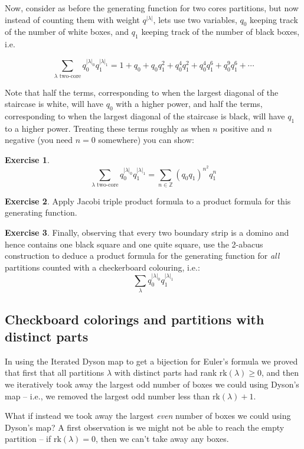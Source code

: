 \documentclass{article}
\theoremstyle{definition}
\newtheorem{exercise}{Exercise}
\begin{document}
Now, consider as before the generating function for two cores partitions, but now instead of counting them with weight $q^{|\lambda|}$, lets use two variables, $q_0$ keeping track of the number of white boxes, and $q_1$ keeping track of the number of black boxes, i.e.

$$\sum_{\lambda \textrm{ two-core}}q_0^{|\lambda|_0}q_1^{|\lambda|_1}=1+q_0+q_0q_1^2+q_0^4q_1^2+q_0^4q_1^6+q_0^9q_1^6+\cdots$$

Note that half the terms, corresponding to when the largest diagonal of the staircase is white, will have $q_0$ with a higher power, and half the terms, corresponding to when the largest diagonal of the staircase is black, will have $q_1$ to a higher power. Treating these terms roughly as when $n$ positive and $n$ negative (you need $n=0$ somewhere) you can show:

\begin{exercise}
$$\sum_{\lambda \textrm{ two-core}}q_0^{|\lambda|_0}q_1^{|\lambda|_1}=\sum_{n\in\mathbb{Z}} (q_0q_1)^{n^2}q_1^n$$
\end{exercise}

\begin{exercise}
Apply Jacobi triple product formula to a product formula for this generating function.\end{exercise}

\begin{exercise}
Finally, observing that every two boundary strip is a domino and hence contains one black square and one quite square, use the 2-abacus construction to deduce a product formula for the generating function for \emph{all} partitions counted with a checkerboard colouring, i.e.:
$$\sum_\lambda q_0^{|\lambda|_0}q_1^{|\lambda|_1}$$
\end{exercise}

\subsection{Checkboard colorings and partitions with distinct parts}

In using the Iterated Dyson map to get a bijection for Euler's formula we proved that first that all partitions $\lambda$ with distinct parts had rank $\textrm{rk}(\lambda)\geq 0$, and then we iteratively took away the largest odd number of boxes we could using Dyson's map -- i.e., we removed the largest odd number less than $\textrm{rk}(\lambda)+1$.

What if instead we took away the largest \emph{even} number of boxes we could using Dyson's map?  A first observation is we might not be able to reach the empty partition -- if $\textrm{rk}(\lambda)=0$, then we can't take away any boxes.  
\end{document}
